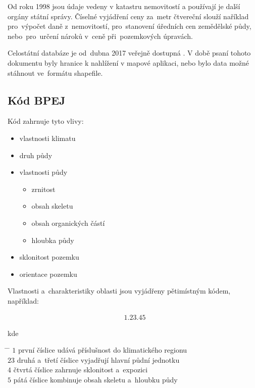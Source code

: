 Od roku 1998 jsou údaje  vedeny v katastru nemovitostí a používají je další orgány státní správy. Číselné vyjádření ceny  za~metr čtvereční slouží naříklad pro~výpočet daně z~nemovitostí, pro~stanovení úředních cen zemědělské půdy, nebo~pro~určení nároků v~ceně při~pozemkových úpravách.

Celostátní databáze  je od~dubna 2017 veřejně dostupná \citep{databaze_bpej}. V době psaní tohoto dokumentu byly hranice  k nahlížení v mapové aplikaci, nebo bylo data možné stáhnout ve~formátu shapefile.

\subsection{Kód BPEJ}
\label{kod_bpej}

Kód  zahrnuje tyto vlivy:
	\begin{itemize}[leftmargin=1.5cm, noitemsep]
		\item vlastnosti klimatu
		\item druh půdy
		\item vlastnosti půdy
			\begin{itemize}[leftmargin=1cm, noitemsep]
				\item zrnitost
				\item obsah skeletu
				\item obsah organických částí
				\item hloubka půdy
			\end{itemize}
		\item sklonitost pozemku
		\item orientace pozemku
	\end{itemize}

Vlastnosti a~charakteristiky oblasti  jsou vyjádřeny pětimístným kódem, například:

\begin{align*}
	1.23.45
\end{align*}

kde
\begin{tabbing}
\hspace{2em} \= \hspace{5em} \= \kill
	\> $1$	\> první číslice udává příslušnost do klimatického regionu \\
	\> $23$	\> druhá a~třetí číslice vyjadřují hlavní půdní jednotku \\
	\> $4$	\> čtvrtá číslice zahrnuje sklonitost a~expozici\\
	\> $5$	\> pátá číslice kombinuje obsah skeletu a~hloubku půdy
\end{tabbing}

